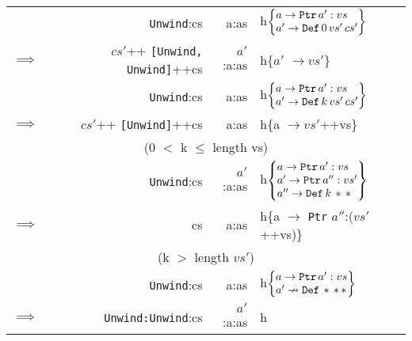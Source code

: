\documentclass[10pt, a4paper]{article}
\begin{document}
\begin{center}
\begin{tabular}{|rrrl|}
& \verb|Unwind|:cs & a:as &
            h$\left\lbrace
                \begin{array}{@{}l@{}}a \rightarrow \verb|Ptr| \, a':vs \\
                           a' \rightarrow \verb|Def| \, 0 \, vs' \, cs' \verb||
                \end{array}
              \right\rbrace$ \\
$\implies$ & $cs'$++ \verb|[Unwind, Unwind]|++cs & $a'$:a:as & h\{$a'$ $\rightarrow vs'$\} \\
\hline


& \verb|Unwind|:cs & a:as &
            h$\left\lbrace
                \begin{array}{@{}l@{}}a \rightarrow \verb|Ptr| \, a':vs \\
                           a' \rightarrow \verb|Def| \, k \, vs' \, cs' \verb||
                \end{array}
              \right\rbrace$ \\
$\implies$ & $cs'$++ \verb|[Unwind]|++cs & a:as & h\{a $\rightarrow vs'$++vs\} \\
\multicolumn{4}{|c|}{(0 $<$ k $\leq$ length vs)} \\
\hline



& \verb|Unwind|:cs & $a'$:a:as &
            h$\left\lbrace
                \begin{array}{@{}l@{}}a \rightarrow \verb|Ptr| \, a':vs \\
                                      a' \rightarrow \verb|Ptr| \, a'':vs' \\
                               a'' \rightarrow \verb|Def| \, k \, * \, *\verb||
                \end{array}
              \right\rbrace$ \\
$\implies$ & cs & a:as & h\{a $\rightarrow$ \verb|Ptr| $a''$:($vs'$++vs)\} \\
\multicolumn{4}{|c|}{(k $>$ length $vs'$)} \\
\hline

& \verb|Unwind|:cs & a:as &
            h$\left\lbrace
                \begin{array}{@{}l@{}}a \rightarrow \verb|Ptr| \, a':vs \\
                                      a' \nrightarrow \verb|Def| \, * \, * \, *
                \end{array}
              \right\rbrace$ \\
$\implies$ & \verb|Unwind:Unwind|:cs & $a'$:a:as & h \\
\hline




\end{tabular}



\end{center}
\end{document}
